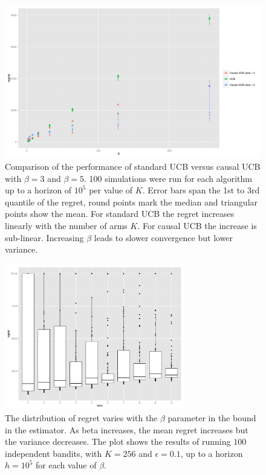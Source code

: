 \documentclass{article}
\theoremstyle{plain}
\theoremstyle{definition}
\begin{document}
\begin{figure}[h]
\caption{Comparison of the performance of standard UCB versus causal UCB with $\beta=3$ and $\beta = 5$. 100 simulations were run for each algorithm up to a horizon of $10^5$ per value of $K$. Error bars span the 1st to 3rd quantile of the regret, round points mark the median and triangular points show the mean. For standard UCB the regret increases linearly with the number of arms $K$. For causal UCB the increase is sub-linear. Increasing $\beta$ leads to slower convergence but lower variance.}
\includegraphics[width=1\textwidth]{regret_vs_K_series_beta.pdf}
\end{figure}

\begin{figure}[H]
\caption{The distribution of regret varies with the $\beta$ parameter in the bound in the estimator. As beta increases, the mean regret increases but the variance decreases. The plot shows the results of running $100$ independent bandits, with $K=256$ and $\epsilon=0.1$, up to a horizon $h=10^5$ for each value of $\beta$. }
\includegraphics[width=0.7\textwidth]{regret_vs_beta_boxplot.pdf}
\end{figure}
\end{document}
